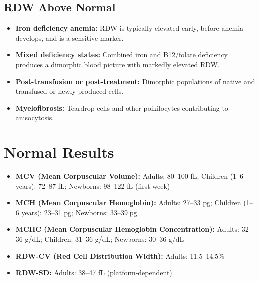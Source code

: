 \subsection*{RDW Above Normal}
\begin{itemize}
  \item \textbf{Iron deficiency anemia:} RDW is typically elevated early, before anemia develops, and is a sensitive marker.
  \item \textbf{Mixed deficiency states:} Combined iron and B12/folate deficiency produces a dimorphic blood picture with markedly elevated RDW.
  \item \textbf{Post-transfusion or post-treatment:} Dimorphic populations of native and transfused or newly produced cells.
  \item \textbf{Myelofibrosis:} Teardrop cells and other poikilocytes contributing to anisocytosis.
\end{itemize}

\section*{Normal Results}
\begin{itemize}
  \item \textbf{MCV (Mean Corpuscular Volume):} Adults: 80--100 fL; Children (1--6 years): 72--87 fL; Newborns: 98--122 fL (first week) \cite{fischbach2023manual}
  \item \textbf{MCH (Mean Corpuscular Hemoglobin):} Adults: 27--33 pg; Children (1--6 years): 23--31 pg; Newborns: 33--39 pg
  \item \textbf{MCHC (Mean Corpuscular Hemoglobin Concentration):} Adults: 32--36 g/dL; Children: 31--36 g/dL; Newborns: 30--36 g/dL
  \item \textbf{RDW-CV (Red Cell Distribution Width):} Adults: 11.5--14.5\%
  \item \textbf{RDW-SD:} Adults: 38--47 fL (platform-dependent)
\end{itemize}

